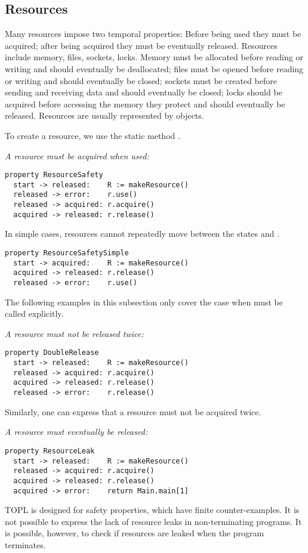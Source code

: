 \documentclass[preprint]{sigplanconf} %
\newcommand{\delimitVerbatim}{\par\nobreak\smallskip\noindent}
\theoremstyle{definition}
\theoremstyle{remark}
\begin{document}
\subsection{Resources} %

Many resources impose two temporal properties:
Before being used they must be acquired;
after being acquired they must be eventually released.
Resources include memory, files, sockets, locks.
Memory must be allocated before reading or writing and should eventually be deallocated;
files must be opened before reading or writing and should eventually be closed;
sockets must be created before sending and receiving data and should eventually be closed;
locks should be acquired before accessing the memory they protect and should eventually be released.
Resources are usually represented by objects.
\delimitVerbatim

\delimitVerbatim
To create a resource, we use the static method \Verb@makeResource@.

\medskip\emph{A resource must be acquired when used:}
\delimitVerbatim
\begin{Verbatim}
property ResourceSafety
  start -> released:    R := makeResource()
  released -> error:    r.use()
  released -> acquired: r.acquire()
  acquired -> released: r.release()
\end{Verbatim}
\delimitVerbatim
In simple cases, resources cannot repeatedly move between the states \Verb@released@ and \Verb@acquired@.
\delimitVerbatim
\begin{Verbatim}
property ResourceSafetySimple
  start -> acquired:    R := makeResource()
  acquired -> released: r.release()
  released -> error:    r.use()
\end{Verbatim}
\delimitVerbatim
The following examples in this subsection only cover the case when \Verb@acquire@ must be called explicitly.

\medskip\emph{A resource must not be released twice:}
\delimitVerbatim
\begin{Verbatim}
property DoubleRelease
  start -> released:    R := makeResource()
  released -> acquired: r.acquire()
  acquired -> released: r.release()
  released -> error:    r.release()
\end{Verbatim}
\delimitVerbatim
Similarly, one can express that a resource must not be acquired twice.

\medskip\emph{A resource must eventually be released:}
\delimitVerbatim
\begin{Verbatim}
property ResourceLeak
  start -> released:    R := makeResource()
  released -> acquired: r.acquire()
  acquired -> released: r.release()
  acquired -> error:    return Main.main[1]
\end{Verbatim}
\delimitVerbatim
TOPL is designed for safety properties, which have finite counter-examples.
It is not possible to express the lack of resource leaks in non-terminating programs.
It is possible, however, to check if resources are leaked when the program terminates.
\end{document}
